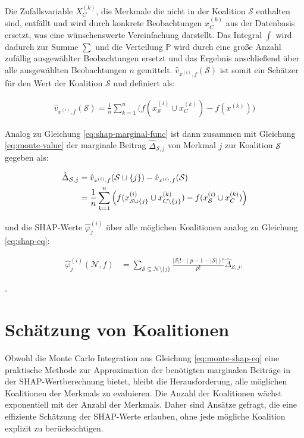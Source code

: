 Die Zufallsvariable $X_{C}^{(k)}$, die Merkmale die nicht in der Koalition $\mathcal{S}$ enthalten sind, 
entfällt und wird durch konkrete Beobachtungen $x_{C}^{(k)}$ aus der Datenbasis ersetzt, 
was eine wünschenswerte Vereinfachung darstellt. Das Integral $\int$ wird dadurch zur Summe $\sum$ und die Verteilung $\mathbb{P}$ wird durch eine große Anzahl zufällig 
ausgewählter Beobachtungen ersetzt und das Ergebnis anschließend über alle ausgewählten Beobachtungen $n$ gemittelt. 
$\hat{v}_{x^{(i)}, f}(\mathcal{S})$ ist somit ein Schätzer für den Wert der Koalition $\mathcal{S}$ und definiert als: 

\begin{align}
    \label{eq:monte-value}
    \hat{v}_{x^{(i)},f}(\mathcal{S}) = \frac{1}{n} \sum_{k=1}^{n} \Big(f(x^{(i)}_{\mathcal{S}} \cup x^{(k)}_{C}) - f(x^{(k)}) \Big)
\end{align}

Analog zu Gleichung \ref{eq:shap-marginal-func} ist dann zusammen mit Gleichung \ref{eq:monte-value} der marginale Beitrag 
$\hat{\Delta}_{\mathcal{S}, j}$ von Merkmal $j$ zur Koalition $\mathcal{S}$ gegeben als: 

\begin{align}
    \label{eq:monte-mar}
    \hat{\Delta}_{\mathcal{S}, j} &= \hat{v}_{x^{(i)},f}(\mathcal{S} \cup \{j\}) - \hat{v}_{x^{(i)},f}(\mathcal{S}) \\ \notag
        &= \frac{1}{n} \sum_{k=1}^{n} \Big(f(x^{(i)}_{\mathcal{S} \cup \{j\}} \cup x^{(k)}_{C \setminus \{j\}}) - f(x^{(i)}_{\mathcal{S}} \cup x^{(k)}_{C}) \Big)
\end{align}

und die SHAP-Werte $\hat{\varphi}_{j}^{(i)}$ über alle möglichen Koalitionen analog zu Gleichung \ref{eq:shap-eq}:

\begin{align}
    \label{eq:monte-shap-eq}
    \hat{\varphi}^{(i)}_{j} (\mathcal{N}, f) &= \sum_{\mathcal{S} \subseteq \mathcal{N} \setminus \{j\}} \frac{|\mathcal{S}|! \cdot (p - 1 - |\mathcal{S}|)!}{p!}\hat{\Delta}_{\mathcal{S}, j},
\end{align}

\cite[S.36]{Molnar_2023}.

\section{Schätzung von Koalitionen}

Obwohl die Monte Carlo Integration aus Gleichung \ref{eq:monte-shap-eq} eine praktische Methode zur Approximation der benötigten marginalen Beiträge in der 
SHAP-Wertberechnung bietet, bleibt die Herausforderung, alle möglichen Koalitionen der Merkmals zu evaluieren. 
Die Anzahl der Koalitionen wächst exponentiell mit der Anzahl der Merkmals. Daher sind Ansätze gefragt, die eine effiziente Schätzung der SHAP-Werte erlauben, 
ohne jede mögliche Koalition explizit zu berücksichtigen.

